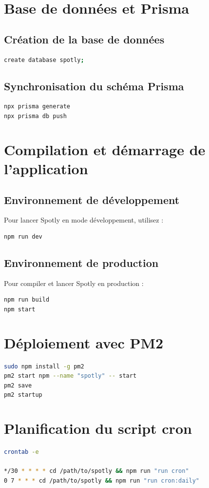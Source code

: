 \documentclass[a4paper,12pt]{article}
\begin{document}
\section{Base de données et Prisma}
\subsection{Création de la base de données}
\begin{lstlisting}[language=bash]
create database spotly;
\end{lstlisting}

\subsection{Synchronisation du schéma Prisma}
\begin{lstlisting}[language=bash]
npx prisma generate
npx prisma db push
\end{lstlisting}

\section{Compilation et démarrage de l'application}
\subsection{Environnement de développement}
Pour lancer Spotly en mode développement, utilisez :
\begin{lstlisting}[language=bash]
npm run dev
\end{lstlisting}

\subsection{Environnement de production}
Pour compiler et lancer Spotly en production :
\begin{lstlisting}[language=bash]
npm run build
npm start
\end{lstlisting}


\section{Déploiement avec PM2}
\begin{lstlisting}[language=bash]
sudo npm install -g pm2
pm2 start npm --name "spotly" -- start
pm2 save
pm2 startup
\end{lstlisting}

\section{Planification du script cron}
\begin{lstlisting}[language=bash]
crontab -e

*/30 * * * * cd /path/to/spotly && npm run "run cron"
0 7 * * * cd /path/to/spotly && npm run "run cron:daily"
\end{lstlisting}
\newpage
\end{document}
